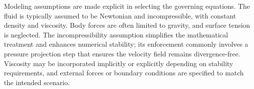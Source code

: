 Modeling assumptions are made explicit in selecting the governing equations. The fluid is typically assumed to be Newtonian and incompressible, with constant density and viscosity. Body forces are often limited to gravity, and surface tension is neglected. %
The incompressibility assumption simplifies the mathematical treatment and enhances numerical stability; its enforcement commonly involves a pressure projection step that ensures the velocity field remains divergence-free. Viscosity may be incorporated implicitly or explicitly depending on stability requirements, and external forces or boundary conditions are specified to match the intended scenario. %



